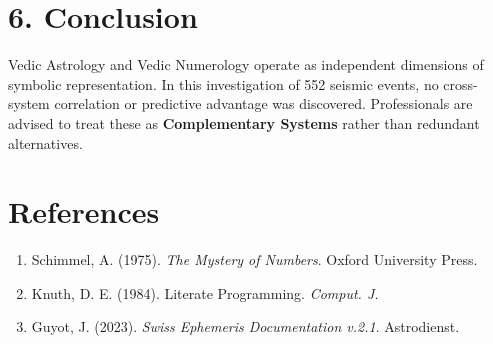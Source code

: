 \documentclass[
  american,
  11pt,
  oneside,
  openany]{scrbook}
\providecommand{\tightlist}{%
  \setlength{\itemsep}{0pt}\setlength{\parskip}{0pt}}
\begin{document}
\chapter{6. Conclusion}\label{conclusion}

Vedic Astrology and Vedic Numerology operate as independent dimensions
of symbolic representation. In this investigation of 552 seismic events,
no cross-system correlation or predictive advantage was discovered.
Professionals are advised to treat these as \textbf{Complementary
Systems} rather than redundant alternatives.

\chapter{References}\label{references}

\begin{enumerate}
\def\labelenumi{\arabic{enumi}.}
\tightlist
\item
  Schimmel, A. (1975). \emph{The Mystery of Numbers}. Oxford University
  Press.
\item
  Knuth, D. E. (1984). Literate Programming. \emph{Comput. J.}
\item
  Guyot, J. (2023). \emph{Swiss Ephemeris Documentation v.2.1}.
  Astrodienst.
\end{enumerate}


\backmatter
\end{document}
